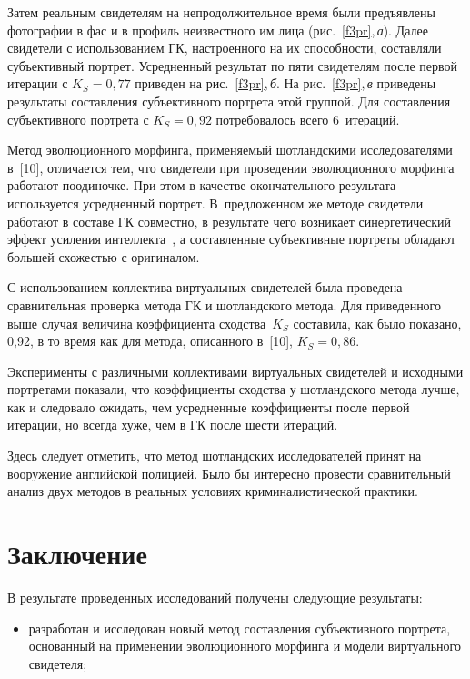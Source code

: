\begin{multicols}{2}
     Затем реальным свидетелям на непродолжительное время были 
предъявлены фотографии в фас и в профиль неизвестного им лица 
(рис.~\ref{f3pr},\,\textit{а}). Далее свидетели с использованием ГК, 
настроенного на их способности, составляли субъективный портрет. 
Усредненный результат по пяти свидетелям после первой итерации с 
$K_S = 0{,}77$ приведен на рис.~\ref{f3pr},\,\textit{б}. На 
рис.~\ref{f3pr},\,\textit{в} приведены результаты со\-став\-ле\-ния субъективного 
портрета этой группой. Для составления субъективного портрета с 
$K_S = 0{,}92$ потребовалось всего 6~итераций. 


     Метод эволюционного морфинга, при\-ме\-ня\-емый шотландскими 
исследователями в~[10], отличается тем, что свидетели при проведении 
эволюционного морфинга работают поодиночке. При этом в качестве 
окончательного результата используется усредненный портрет. 
В~предложенном же методе свидетели работают в составе ГК совместно, в 
результате чего возникает синергетический эффект усиления 
интеллекта~\cite{4pr}, а составленные субъективные портреты обладают 
большей схо\-жестью с оригиналом. 
     
     С использованием коллектива виртуальных свидетелей была проведена 
сравнительная проверка метода ГК и шотландского метода. Для приведенного 
выше случая величина коэффициента сходства~$K_S$ составила, как было 
показано, 0,92, в то время как для метода, описанного в~[10], $K_S = 0{,}86$. 
{

}
     
     Эксперименты с различными коллективами виртуальных свидетелей и 
исходными портретами показали, что коэффициенты сходства у шотландского 
метода лучше, как и следовало ожидать, чем усредненные коэффициенты после 
первой итерации, но всегда хуже, чем в ГК после шести итераций. 
     
     Здесь следует отметить, что метод шотландских исследователей принят 
на вооружение английской полицией. Было бы интересно провести 
сравнительный анализ двух методов в реальных условиях криминалистической 
практики.
     
\section{Заключение}
     
     В результате проведенных исследований получены следующие 
результаты:
     \begin{itemize}
\item разработан и исследован новый метод со\-став\-ле\-ния субъективного 
портрета, основанный на применении эволюционного морфинга и модели 
виртуального свидетеля;\end{itemize}


\end{multicols}

